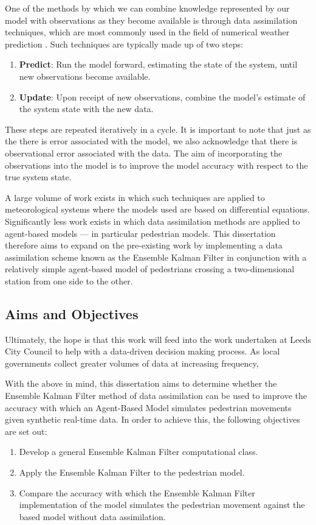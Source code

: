 One of the methods by which we can combine knowledge represented by our model
with observations as they become available is through data assimilation
techniques, which are most commonly used in the field of numerical weather
prediction \citep{kalnay2003atmospheric}.
Such techniques are typically made up of two steps:
\begin{enumerate}
    \item \textbf{Predict}: Run the model forward, estimating the state of the system,
    until new observations become available.
    \item \textbf{Update}: Upon receipt of new observations, combine the model's estimate
    of the system state with the new data.
\end{enumerate}
These steps are repeated iteratively in a cycle.
It is important to note that just as the there is error associated with the
model, we also acknowledge that there is observational error associated with the
data.
The aim of incorporating the observations into the model is to improve the model
accuracy with respect to the true system state.

A large volume of work exists in which such techniques are applied to
meteorological systems where the models used are based on differential
equations.
Significantly less work exists in which data assimilation methods are applied to
agent-based models --- in particular pedestrian models.
This dissertation therefore aims to expand on the pre-existing work by
implementing a data assimilation scheme known as the Ensemble Kalman Filter in
conjunction with a relatively simple agent-based model of pedestrians crossing a
two-dimensional station from one side to the other.

\subsection{Aims and Objectives}\label{sub:intro:aims}

Ultimately, the hope is that this work will feed into the work undertaken at
Leeds City Council to help with a data-driven decision making process.
As local governments collect greater volumes of data at increasing frequency, 

With the above in mind, this dissertation aims to determine whether the Ensemble
Kalman Filter method of data assimilation can be used to improve the accuracy
with which an Agent-Based Model simulates pedestrian movements given synthetic
real-time data.
In order to achieve this, the following objectives are set out:
\begin{enumerate}
    \item Develop a general Ensemble Kalman Filter computational class.
    \item Apply the Ensemble Kalman Filter to the pedestrian model.
    \item Compare the accuracy with which the Ensemble Kalman Filter
        implementation of the model simulates the pedestrian movement against
        the based model without data assimilation.
\end{enumerate}

